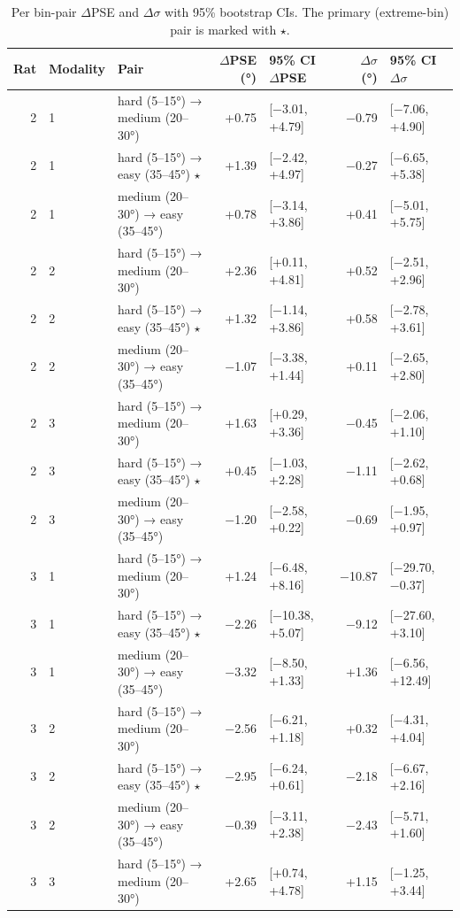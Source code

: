 \begin{table}[htbp]
  \centering
  \caption{Per bin-pair $\Delta$PSE and $\Delta\sigma$ with 95\% bootstrap CIs. The primary (extreme-bin) pair is marked with $\star$.}
  \label{tab:perceptual_bias_details}
  \begin{tabular}{rllrlrl}
    \toprule
    Rat & Modality & Pair & $\Delta$PSE (°) & 95\% CI $\Delta$PSE & $\Delta\sigma$ (°) & 95\% CI $\Delta\sigma$ \\
    \midrule
    2 & 1 & hard (5–15°) → medium (20–30°) & +0.75 & [−3.01, +4.79] & −0.79 & [−7.06, +4.90] \\
    2 & 1 & hard (5–15°) → easy (35–45°) $\star$ & +1.39 & [−2.42, +4.97] & −0.27 & [−6.65, +5.38] \\
    2 & 1 & medium (20–30°) → easy (35–45°) & +0.78 & [−3.14, +3.86] & +0.41 & [−5.01, +5.75] \\
    2 & 2 & hard (5–15°) → medium (20–30°) & +2.36 & [+0.11, +4.81] & +0.52 & [−2.51, +2.96] \\
    2 & 2 & hard (5–15°) → easy (35–45°) $\star$ & +1.32 & [−1.14, +3.86] & +0.58 & [−2.78, +3.61] \\
    2 & 2 & medium (20–30°) → easy (35–45°) & −1.07 & [−3.38, +1.44] & +0.11 & [−2.65, +2.80] \\
    2 & 3 & hard (5–15°) → medium (20–30°) & +1.63 & [+0.29, +3.36] & −0.45 & [−2.06, +1.10] \\
    2 & 3 & hard (5–15°) → easy (35–45°) $\star$ & +0.45 & [−1.03, +2.28] & −1.11 & [−2.62, +0.68] \\
    2 & 3 & medium (20–30°) → easy (35–45°) & −1.20 & [−2.58, +0.22] & −0.69 & [−1.95, +0.97] \\
    3 & 1 & hard (5–15°) → medium (20–30°) & +1.24 & [−6.48, +8.16] & −10.87 & [−29.70, −0.37] \\
    3 & 1 & hard (5–15°) → easy (35–45°) $\star$ & −2.26 & [−10.38, +5.07] & −9.12 & [−27.60, +3.10] \\
    3 & 1 & medium (20–30°) → easy (35–45°) & −3.32 & [−8.50, +1.33] & +1.36 & [−6.56, +12.49] \\
    3 & 2 & hard (5–15°) → medium (20–30°) & −2.56 & [−6.21, +1.18] & +0.32 & [−4.31, +4.04] \\
    3 & 2 & hard (5–15°) → easy (35–45°) $\star$ & −2.95 & [−6.24, +0.61] & −2.18 & [−6.67, +2.16] \\
    3 & 2 & medium (20–30°) → easy (35–45°) & −0.39 & [−3.11, +2.38] & −2.43 & [−5.71, +1.60] \\
    3 & 3 & hard (5–15°) → medium (20–30°) & +2.65 & [+0.74, +4.78] & +1.15 & [−1.25, +3.44] \\

\end{tabular}
\end{table}
